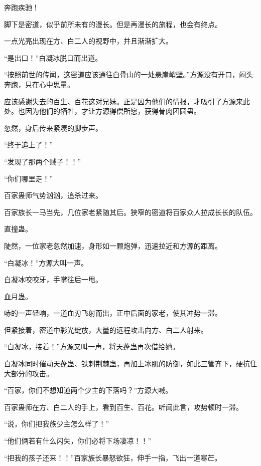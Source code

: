 
\begin{this_body}



奔跑疾驰！

脚下是密道，似乎前所未有的漫长。但是再漫长的旅程，也会有终点。

一点光亮出现在方、白二人的视野中，并且渐渐扩大。

“是出口！”白凝冰脱口而出道。

“按照前世的传闻，这密道应该通往白骨山的一处悬崖峭壁。”方源没有开口，闷头奔跑，只在心中思量。

应该感谢失去的百生、百花这对兄妹。正是因为他们的情报，才吸引了方源来此处。也因为他们的牺牲，才让方源得偿所愿，获得骨肉团圆蛊。

忽然，身后传来紧凑的脚步声。

“终于追上了！”

“发现了那两个贼子！！”

“你们哪里走！”

百家蛊师气势汹汹，追杀过来。

百家族长一马当先，几位家老紧随其后。狭窄的密道将百家众人拉成长长的队伍。

直撞蛊。

陡然，一位家老忽然加速，身形如一颗炮弹，迅速拉近和方源的距离。

“白凝冰！”方源大叫一声。

白凝冰咬咬牙，手掌往后一甩。

血月蛊。

哧的一声轻响，一道血刃飞射而出，正中后面的家老，使其冲势一滞。

但紧接着，密道中彩光绽放，大量的远程攻击向方、白二人射来。

“白凝冰，接着！”方源又叫一声，将天蓬蛊再次借给她。

白凝冰同时催动天蓬蛊、铁刺荆棘蛊，再加上冰肌的防御，如此三管齐下，硬抗住大部分的攻击。

“百家，你们不想知道两个少主的下落吗？”方源大喊。

百家蛊师在方、白二人的手上，看到百生、百花。听闻此言，攻势顿时一滞。

“说，你们把我族少主怎么样了！”

“他们俩若有什么闪失，你们必将下场凄凉！！”

“把我的孩子还来！！”百家族长暴怒欲狂，伸手一指，飞出一道寒芒。


\end{this_body}
